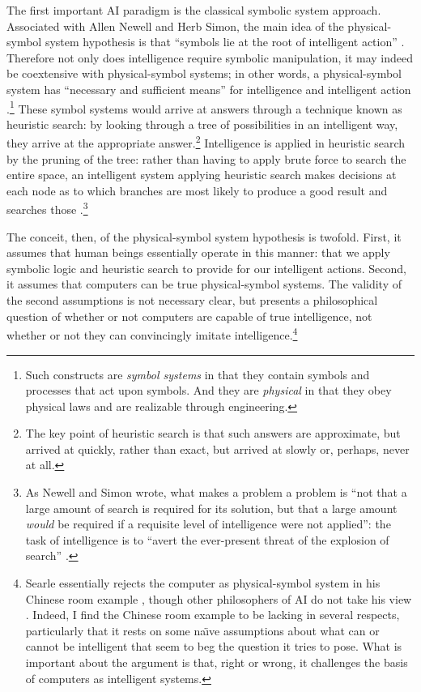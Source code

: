 The first important AI paradigm is the classical symbolic system
approach. Associated with Allen Newell and Herb Simon, the main idea of the
physical-symbol system hypothesis is that ``symbols lie at the root of
intelligent action'' \cite[p. 109]{newellsimon}. Therefore not only
does intelligence require symbolic manipulation, it may indeed be
coextensive with physical-symbol systems; in other words, a
physical-symbol system has ``necessary and sufficient means'' for
intelligence and intelligent action \cite[p. 111]{newellsimon}.\footnote{Such
constructs are \emph{symbol systems} in that they contain symbols and processes
that act upon symbols. And they are \emph{physical} in that they obey
physical laws and are realizable through engineering.}
These symbol systems would arrive at answers through a technique known as
heuristic search: by looking through a tree of possibilities in an
intelligent way, they arrive at the appropriate answer.\footnote{The key
  point of heuristic search is that such answers are approximate, but
  arrived at quickly, rather than exact, but arrived at slowly or,
  perhaps, never at all.} Intelligence is applied in heuristic search
by the pruning of the tree: rather than having to apply brute force to
search the entire space, an intelligent system applying heuristic
search makes decisions at each node as to which branches are most
likely to produce a good result and searches those \cite[p.
  124]{newellsimon}.\footnote{As Newell and Simon wrote, what makes a problem a
problem is ``not that a large amount of search is required for its
solution, but that a large amount \emph{would} be required if a requisite
level of intelligence were not applied'': the task of intelligence is
to ``avert the ever-present threat of the explosion of
search'' \cite[p. 125]{newellsimon}.}


The conceit, then, of the physical-symbol system hypothesis is twofold.
First, it assumes that
human beings essentially operate in this manner: that we apply
symbolic logic and heuristic search to provide for our intelligent
actions. Second, it assumes that computers can be true physical-symbol
systems. The validity of the second assumptions is not necessary
clear, but presents a philosophical question of whether or not computers are capable of
true intelligence, not whether or not they can
convincingly imitate intelligence.\footnote{Searle essentially rejects
  the computer as physical-symbol system in his Chinese room example
  \cite{chineseSearle}, though other philosophers of AI do not take
  his view \cite{escapingBoden}. Indeed, I find the Chinese room example to be
  lacking in several respects, particularly that it rests on some
  na\"{\i}ve assumptions about what can or cannot be intelligent that seem to beg
  the question it tries to pose. What is important about the
  argument is that, right or wrong, it challenges the basis of
  computers as intelligent systems.}

